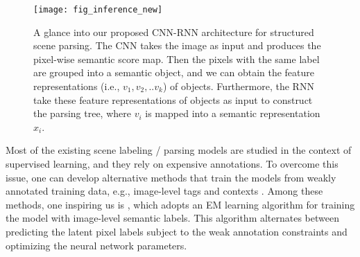 \documentclass[10pt,twocolumn,letterpaper]{article}
\begin{document}


\begin{figure*}[t!]
\centering
\texttt{[image: fig\_inference\_new]}
\caption{A glance into our proposed CNN-RNN architecture for structured scene parsing. The CNN takes the image as input and produces the pixel-wise semantic score map. Then the pixels with the same label are grouped into a semantic object, and we can obtain the feature representations (i.e., $v_1, v_2,..v_k$) of objects. Furthermore, the RNN take these feature representations of objects as input to construct the parsing tree, where $v_i$ is mapped into a semantic representation $x_i$.}
\label{fig:inference}
\vspace{-2mm}
\end{figure*}

Most of the existing scene labeling / parsing models are studied in the context of supervised learning, and they rely on expensive annotations. To overcome this issue, one can develop alternative methods that train the models from weakly annotated training data, e.g., image-level tags and contexts \cite{DBLP:Weakly2}\cite{DBLP:Weakly-MultiInstance}\cite{DBLP:WeaklySegmentation}. Among these methods, one inspiring us is \cite{DBLP:WeaklySegmentation}, which adopts an EM learning algorithm for training the model with image-level semantic labels. This algorithm alternates between predicting the latent pixel labels subject to the weak annotation constraints and optimizing the neural network parameters.
\end{document}
